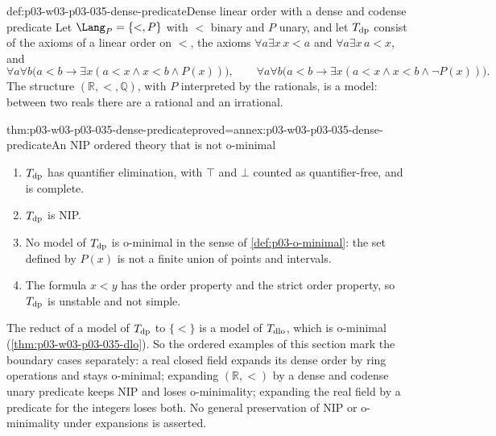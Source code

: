 \begin{hbdefinition}{def:p03-w03-p03-035-dense-predicate}{Dense linear order with a dense and codense predicate}
Let \(\Lang_P=\{<,P\}\) with \(<\) binary and \(P\) unary, and let
\(T_{\rm dp}\) consist of the axioms of a linear order on \(<\), the axioms
\(\forall a\exists x\,x<a\) and \(\forall a\exists x\,a<x\), and
\[
  \forall a\forall b\bigl(a<b\rightarrow\exists x(a<x\wedge x<b\wedge
  P(x))\bigr),\qquad
  \forall a\forall b\bigl(a<b\rightarrow\exists x(a<x\wedge x<b\wedge
  \neg P(x))\bigr).
\]
The structure \((\mathbb R,<,\mathbb Q)\), with \(P\) interpreted by the
rationals, is a model: between two reals there are a rational and an
irrational.
\end{hbdefinition}

\begin{hbtheorem}{thm:p03-w03-p03-035-dense-predicate}{proved=annex:p03-w03-p03-035-dense-predicate}{An NIP ordered theory that is not o-minimal}
\begin{enumerate}
  \item \(T_{\rm dp}\) has quantifier elimination, with \(\top\) and
        \(\bot\) counted as quantifier-free, and is complete.
  \item \(T_{\rm dp}\) is NIP.
  \item No model of \(T_{\rm dp}\) is o-minimal in the sense of
        \cref{def:p03-o-minimal}: the set defined by \(P(x)\) is not a finite
        union of points and intervals.
  \item The formula \(x<y\) has the order property and the strict order
        property, so \(T_{\rm dp}\) is unstable and not simple.
\end{enumerate}
\end{hbtheorem}

The reduct of a model of \(T_{\rm dp}\) to \(\{<\}\) is a model of
\(T_{\rm dlo}\), which is o-minimal (\cref{thm:p03-w03-p03-035-dlo}).  So the
ordered examples of this section mark the boundary cases separately: a
real closed field expands its dense order by ring operations and stays
o-minimal; expanding \((\mathbb R,<)\) by a dense and codense unary
predicate keeps NIP and loses o-minimality; expanding the real field by a
predicate for the integers loses both.  No general preservation of NIP or o-minimality under
expansions is asserted.

